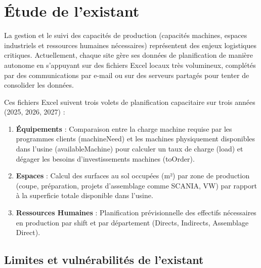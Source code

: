 \section{Étude de l’existant}

La gestion et le suivi des capacités de production (capacités machines, espaces industriels et ressources humaines nécessaires) représentent des enjeux logistiques critiques. Actuellement, chaque site gère ses données de planification de manière autonome en s'appuyant sur des fichiers Excel locaux très volumineux, complétés par des communications par e-mail ou sur des serveurs partagés pour tenter de consolider les données.

Ces fichiers Excel suivent trois volets de planification capacitaire sur trois années (2025, 2026, 2027) :
\begin{enumerate}
    \item \textbf{Équipements} : Comparaison entre la charge machine requise par les programmes clients (machineNeed) et les machines physiquement disponibles dans l'usine (availableMachine) pour calculer un taux de charge (load) et dégager les besoins d'investissements machines (toOrder).
    \item \textbf{Espaces} : Calcul des surfaces au sol occupées (m²) par zone de production (coupe, préparation, projets d'assemblage comme SCANIA, VW) par rapport à la superficie totale disponible dans l'usine.
    \item \textbf{Ressources Humaines} : Planification prévisionnelle des effectifs nécessaires en production par shift et par département (Directs, Indirects, Assemblage Direct).
\end{enumerate}

\subsection{Limites et vulnérabilités de l'existant}

